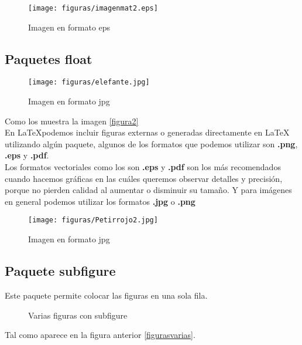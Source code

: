 \documentclass[12pt]{article}
\begin{document}
\begin{figure}[H] %
\centering
\texttt{[image: figuras/imagenmat2.eps]}
\caption{Imagen en formato eps} %
\label{figura1}
\end{figure}

\subsection{Paquetes float}

\begin{figure}[H]
\centering
\texttt{[image: figuras/elefante.jpg]}
\caption{Imagen en formato jpg} %
\label{figura2} %
\end{figure}

Como los muestra la imagen \eqref{figura2} \\
En \LaTeX podemos incluir figuras externas o generadas directamente en \LaTeX \, utilizando algún paquete, algunos de los formatos que podemos utilizar son \textbf{.png}, \textbf{.eps} y \textbf{.pdf}. \\[0.5cm]
Los formatos vectoriales como los son \textbf{.eps} y \textbf{.pdf} son los más recomendados cuando hacemos gráficas en las cuáles queremos observar detalles y precisión, porque no pierden calidad al aumentar o disminuir su tamaño. Y para imágenes en general podemos utilizar los formatos \textbf{.jpg} o \textbf{.png}

\begin{figure}[H]
\centering
\texttt{[image: figuras/Petirrojo2.jpg]}
\caption{Imagen en formato jpg}
\label{figura3} 
\end{figure}

\subsection{Paquete subfigure}

Este paquete permite colocar las figuras en una sola fila.

\begin{figure}[!ht]
\centering
{}
\quad
{}
\quad
{}
\caption{Varias figuras con subfigure}
\label{figurasvarias} 
\end{figure}
Tal como aparece en la figura anterior \eqref{figurasvarias}.
\end{document}
